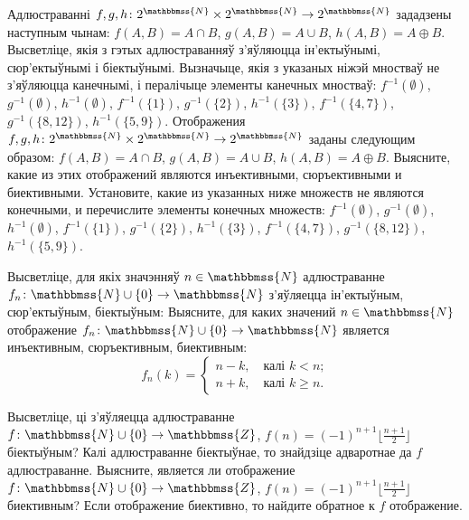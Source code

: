 \begin{problemList}
\problemItemSimple
{Адлюстраванні $f, g, h \colon 2^{\mathbbmss{N}} \times 2^{\mathbbmss{N}} \to 2^{\mathbbmss{N}}$ зададзены наступным чынам: $f(A, B) = A \cap B$,
$g(A, B) = A \cup B$, $h(A, B) = A \oplus B$. Высветліце, якія з гэтых адлюстраванняў з'яўляюцца ін'ектыўнымі, сюр'ектыўнымі і біектыўнымі. Вызначыце, якія з указаных ніжэй мностваў не з'яўляюцца канечнымі, і пералічыце элементы канечных мностваў: $f^{-1}(\emptyset)$,
$g^{-1}(\emptyset)$, $h^{-1}(\emptyset)$, $f^{-1}(\{1\})$,
$g^{-1}(\{2\})$, $h^{-1}(\{3\})$, $f^{-1}(\{4, 7\})$,
$g^{-1}(\{8, 12\})$, $h^{-1}(\{5, 9\})$.}
{Отображения $f, g, h \colon 2^{\mathbbmss{N}} \times 2^{\mathbbmss{N}} \to 2^{\mathbbmss{N}}$ заданы следующим образом: $f(A, B) = A \cap B$, $g(A, B) = A \cup B$, $h(A, B) = A \oplus B$. Выясните, какие из этих отображений являются инъективными, сюръективными и биективными. Установите, какие из указанных ниже множеств не являются конечными, и перечислите элементы конечных множеств: $f^{-1}(\emptyset)$,
$g^{-1}(\emptyset)$, $h^{-1}(\emptyset)$, $f^{-1}(\{1\})$,
$g^{-1}(\{2\})$, $h^{-1}(\{3\})$, $f^{-1}(\{4, 7\})$,
$g^{-1}(\{8, 12\})$, $h^{-1}(\{5, 9\})$.}

\bigskip

\problemItemWithCommonPart
{Высветліце, для якіх значэнняў $n \in \mathbbmss{N}$ адлюстраванне $f_n \colon \mathbbmss{N} \cup \{0\} \to \mathbbmss{N}$ з'яўляецца ін'ектыўным, сюр'ектыўным, біектыўным:}
{Выясните, для каких значений $n \in \mathbbmss{N}$ отображение $f_n \colon \mathbbmss{N} \cup \{0\} \to \mathbbmss{N}$ является инъективным, сюръективным, биективным:}
{%
\begin{equation*}
f_n(k) =
\begin{cases}
n - k, \quad \text{калі $k < n$;} \\
n + k, \quad \text{калі $k \ge n$.}
\end{cases}
\end{equation*}
}

\bigskip

\problemItemSimple
{Высветліце, ці з'яўляецца адлюстраванне $f \colon \mathbbmss{N} \cup \{0\} \to \mathbbmss{Z}$, $f(n) = (-1)^{n + 1}\bigl\lfloor\frac{n + 1}{2}\bigr\rfloor$ біектыўным? Калі адлюстраванне біектыўнае, то знайдзіце адваротнае да $f$ адлюстраванне.}
{Выясните, является ли отображение $f \colon \mathbbmss{N} \cup \{0\} \to \mathbbmss{Z}$, $f(n) = (-1)^{n + 1}\bigl\lfloor\frac{n + 1}{2}\bigr\rfloor$ биективным? Если отображение биективно, то найдите обратное к $f$ отображение.}

\bigskip


\end{problemList}

